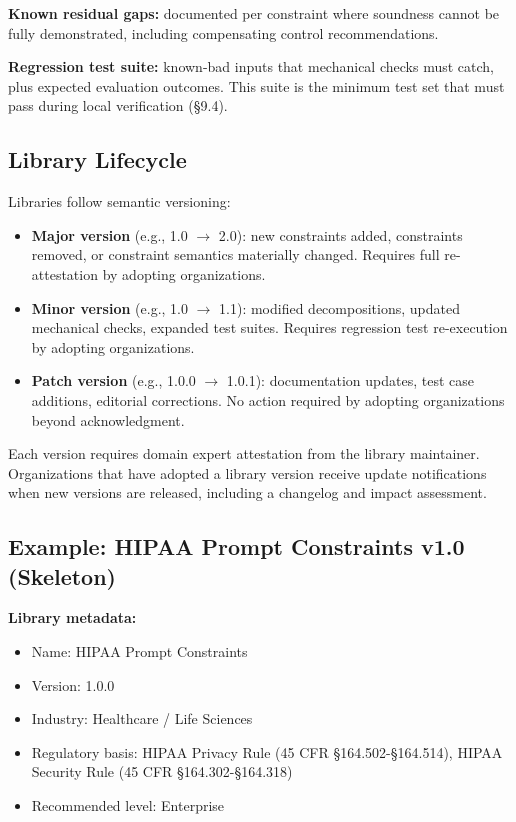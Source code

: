 \textbf{Known residual gaps:} documented per constraint where soundness cannot be fully demonstrated, including compensating control recommendations.

\textbf{Regression test suite:} known-bad inputs that mechanical checks must catch, plus expected evaluation outcomes. This suite is the minimum test set that must pass during local verification (\S{}9.4).

\subsection{Library Lifecycle}
\label{sec:templates-C-1-2}


Libraries follow semantic versioning:

\begin{itemize}
  \item \textbf{Major version} (e.g., 1.0 $\to$ 2.0): new constraints added, constraints removed, or constraint semantics materially changed. Requires full re-attestation by adopting organizations.
  \item \textbf{Minor version} (e.g., 1.0 $\to$ 1.1): modified decompositions, updated mechanical checks, expanded test suites. Requires regression test re-execution by adopting organizations.
  \item \textbf{Patch version} (e.g., 1.0.0 $\to$ 1.0.1): documentation updates, test case additions, editorial corrections. No action required by adopting organizations beyond acknowledgment.
\end{itemize}


Each version requires domain expert attestation from the library maintainer. Organizations that have adopted a library version receive update notifications when new versions are released, including a changelog and impact assessment.

\subsection{Example: HIPAA Prompt Constraints v1.0 (Skeleton)}
\label{sec:templates-C-1-3}


\textbf{Library metadata:}
\begin{itemize}
  \item Name: HIPAA Prompt Constraints
  \item Version: 1.0.0
  \item Industry: Healthcare / Life Sciences
  \item Regulatory basis: HIPAA Privacy Rule (45 CFR \S{}164.502-\S{}164.514), HIPAA Security Rule (45 CFR \S{}164.302-\S{}164.318)
  \item Recommended level: Enterprise
\end{itemize}


